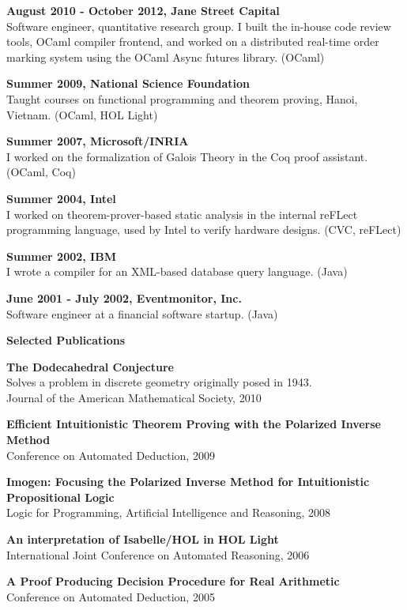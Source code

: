 \documentclass[a4paper,12pt,final]{memoir}
\newcommand{\SmallSep}{\vspace{0.5em}}
\newcommand{\CVSection}[1]
{\Large\textbf{#1}\par
  \SmallSep\normalsize\normalfont}
\newcommand{\CVItem}[1]
{\textbf{\color{RoyalBlue} #1}}
\begin{document}
\CVItem{August 2010 - October 2012, Jane Street Capital}\\
Software engineer, quantitative research group.
I built the in-house code review tools, OCaml compiler frontend, and
worked on a distributed real-time order marking system using the
OCaml Async futures library.  (OCaml)
\SmallSep

\CVItem{Summer 2009, National Science Foundation} \\
Taught courses on functional programming and theorem proving, Hanoi,
Vietnam. (OCaml, HOL Light)
\SmallSep

\CVItem{Summer 2007, Microsoft/INRIA} \\
I worked on the formalization of Galois Theory in the Coq proof
assistant. (OCaml, Coq)
\SmallSep

\CVItem{Summer 2004, Intel} \\
I worked on theorem-prover-based static analysis in the internal
reFLect programming language, used by Intel to verify hardware
designs. (CVC, reFLect)
\SmallSep

\CVItem{Summer 2002, IBM} \\
I wrote a compiler for an XML-based database query language. (Java)
\SmallSep

\CVItem{June 2001 - July 2002, Eventmonitor, Inc.} \\
Software engineer at a financial software startup. (Java)
\SmallSep

\CVSection{Selected Publications}

\CVItem{The Dodecahedral Conjecture} \\
Solves a problem in discrete geometry originally posed in 1943.\\
Journal of the American Mathematical Society, 2010
\SmallSep

\CVItem{Efficient Intuitionistic Theorem Proving with the Polarized Inverse Method}\\
Conference on Automated Deduction, 2009
\SmallSep

\CVItem{Imogen: Focusing the Polarized Inverse Method for Intuitionistic Propositional Logic}\\
Logic for Programming, Artificial Intelligence and Reasoning, 2008
\SmallSep

\CVItem{An interpretation of Isabelle/HOL in HOL Light}\\
International Joint Conference on Automated Reasoning, 2006
\SmallSep

\CVItem{A Proof Producing Decision Procedure for Real Arithmetic}\\
Conference on Automated Deduction, 2005
\SmallSep
\end{document}
